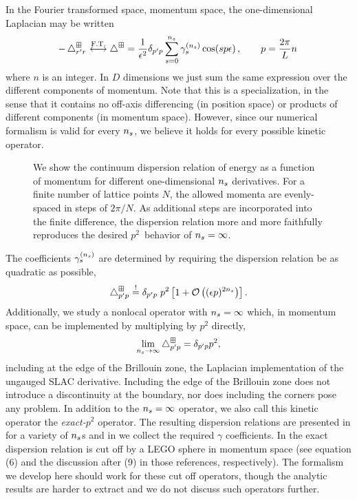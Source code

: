 In the Fourier transformed space, momentum space, the one-dimensional Laplacian may be written
\begin{equation}
    \label{eq:laplacian}
    -\mathop{}\!\mathbin\bigtriangleup_{r'r^{}}^\boxplus
    \overset{\text{F.T.}}{\longleftrightarrow}
    \mathop{}\!\mathbin\bigtriangleup^\boxplus
    =
    \frac{1}{\epsilon^2}
    \delta_{p'p}
    \sum_{s=0}^{{n_s}} \gamma_s^{({n_s})} \cos(s p \epsilon)
    \, , \qquad p = \frac{2 \pi}{L} n \,
\end{equation}
where $n$ is an integer.
In $D$ dimensions we just sum the same expression over the different components of momentum.
Note that this is a specialization, in the sense that it contains no off-axis differencing (in position space) or products of different components (in momentum space).
However, since our numerical formalism is valid for every ${n_s}$, we believe it holds for every possible kinetic operator.

\begin{figure}
    
    \caption{We show the continuum dispersion relation of energy as a function of momentum for different one-dimensional ${n_s}$ derivatives.  For a finite number of lattice points $N$, the allowed momenta are evenly-spaced in steps of $2\pi/N$.
    As additional steps are incorporated into the finite difference, the dispersion relation more and more faithfully reproduces the desired $p^2$~behavior of ${n_s}=\infty$.
    }
    \label{fig:dispersion relation}
\end{figure}

The coefficients $\gamma_{s}^{({n_s})}$ are determined by requiring the dispersion relation be as quadratic as possible,
\begin{equation}
    \label{eq:gamma determination}
    \mathop{}\!\mathbin\bigtriangleup^\boxplus_{p'p}
    \overset{!}{=}
    \delta_{p'p} \;
    p^2 \left[
        1 + \mathcal{O}\left((\epsilon p)^{2{n_s}}\right)
    \right].
\end{equation}
Additionally, we study a nonlocal operator with ${n_s}=\infty$ which, in momentum space, can be implemented by multiplying by $p^2$ directly,
\begin{equation}
    \lim\limits_{n_s \to \infty}
    \mathop{}\!\mathbin\bigtriangleup^\boxplus_{p'p}
    =
    \delta_{p'p} p^2,
\end{equation}
including at the edge of the Brillouin zone, the Laplacian implementation of the ungauged SLAC derivative.
Including the edge of the Brillouin zone does not introduce a discontinuity at the boundary, nor does including the corners pose any problem.
In addition to the ${n_s}=\infty$ operator, we also call this kinetic operator the \emph{exact-$p^2$} operator.
The resulting dispersion relations are presented in  for a variety of ${n_s}$s and in  we collect the required $\gamma$ coefficients.
In  the exact dispersion relation is cut off by a LEGO sphere in momentum space (see equation (6) and the discussion after (9) in those references, respectively).
The formalism we develop here should work for these cut off operators, though the analytic results are harder to extract and we do not discuss such operators further.

